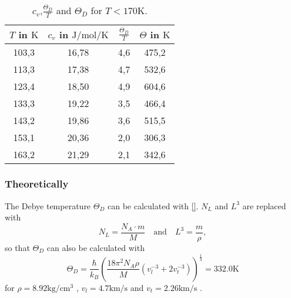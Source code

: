 \begin{table}
    \centering
    \begin{tabular}{c c c c}
        \toprule
        $T$ in $\si{\kelvin}$ & $c_v$ in $\si{\joule\per\mole\per\kelvin}$ & $\frac{\Theta_D}{T}$ & $\Theta$ in $\si{\kelvin}$ \\
        \midrule
        103,3  &  16,78  &  4,6  &  475,2  \\
        113,3  &  17,38  &  4,7  &  532,6  \\
        123,4  &  18,50  &  4,9  &  604,6  \\
        133,3  &  19,22  &  3,5  &  466,4  \\
        143,2  &  19,86  &  3,6  &  515,5  \\
        153,1  &  20,36  &  2,0  &  306,3  \\
        163,2  &  21,29  &  2,1  &  342,6  \\
        \bottomrule
    \end{tabular}
    \caption{$c_v$,$\frac{\Theta_D}{T}$ and $\Theta_D$ for $T < 170 \si{\kelvin}$. }
    \label{tab:deb2}
\end{table}

\subsubsection{Theoretically}
The Debye temperature $\Theta_D$ can be calculated with \eqref{}.
$N_L$ and $L^3$ are replaced with
\begin{equation*}
    N_L = \frac{N_A \cdot m }{M} \quad \text{and} \quad L^3= \frac{m}{\rho},
\end{equation*}
so that $\Theta_D$ can also be calculated with
\begin{equation}
    \Theta_D = \frac{\hbar}{k_B} \left( \frac{18 \pi^2 N_A \rho}{M}\left( v^{-3}_l + 2 v^{-3}_t\right)\right)^{\frac{1}{3}} = 332.0 \si{\kelvin}
\end{equation}
\noindent for $\rho = 8.92 \si{\kg\per\cubic\cm}$ \cite{V0_kupfer},
 $v_l=4.7 \si{\km\per\s}$ and $v_t=2.26 \si{\km\per\s}$ \cite{V47}.


